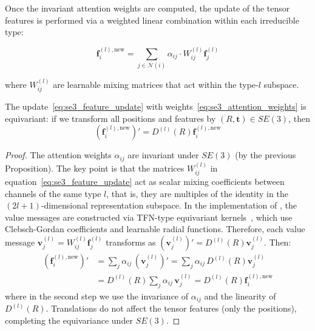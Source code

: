 Once the invariant attention weights are computed, the update of the tensor features is performed via a weighted linear combination within each irreducible type:

\begin{equation}\label{eq:se3_feature_update}
\mathbf{f}_i^{(l), \text{new}} = \sum_{j \in \mathcal{N}(i)} \alpha_{ij} \cdot W_{ij}^{(l)} \mathbf{f}_j^{(l)}
\end{equation}

where $W_{ij}^{(l)}$ are learnable mixing matrices that act within the type-$l$ subspace.

\begin{theorem}\label{thm:se3_transformer_equivariance}
The update~\eqref{eq:se3_feature_update} with weights~\eqref{eq:se3_attention_weights} is equivariant: if we transform all positions and features by $(R, \mathbf{t}) \in SE(3)$, then
\begin{equation}
(\mathbf{f}_i^{(l), \text{new}})' = D^{(l)}(R) \mathbf{f}_i^{(l), \text{new}}
\end{equation}
\end{theorem}

\begin{proof}
The attention weights $\alpha_{ij}$ are invariant under $SE(3)$ (by the previous Proposition). The key point is that the matrices $W_{ij}^{(l)}$ in equation~\eqref{eq:se3_feature_update} act as scalar mixing coefficients between channels of the same type $l$, that is, they are multiples of the identity in the $(2l+1)$-dimensional representation subspace. In the implementation of \citet{fuchs2020se3transformers}, the value messages are constructed via TFN-type equivariant kernels~\citep{thomas2018tensorfieldnetworks}, which use Clebsch-Gordan coefficients and learnable radial functions. Therefore, each value message $\mathbf{v}_j^{(l)} = W_{ij}^{(l)} \mathbf{f}_j^{(l)}$ transforms as $(\mathbf{v}_j^{(l)})' = D^{(l)}(R) \mathbf{v}_j^{(l)}$. Then:
\begin{align}
(\mathbf{f}_i^{(l), \text{new}})' &= \sum_j \alpha_{ij} \, (\mathbf{v}_j^{(l)})' = \sum_j \alpha_{ij} \, D^{(l)}(R) \mathbf{v}_j^{(l)} \\
&= D^{(l)}(R) \sum_j \alpha_{ij} \, \mathbf{v}_j^{(l)} = D^{(l)}(R) \mathbf{f}_i^{(l), \text{new}}
\end{align}
where in the second step we use the invariance of $\alpha_{ij}$ and the linearity of $D^{(l)}(R)$. Translations do not affect the tensor features (only the positions), completing the equivariance under $SE(3)$.
\end{proof}

